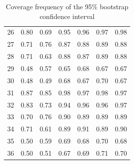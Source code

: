 \documentclass[authoryear, review, 11pt]{elsarticle}
\begin{document}
\begin{table}[ht]
\begin{center}
\begin{tabular}{rrrrrrr}
  26 & 0.80 & 0.69 & 0.95 & 0.96 & 0.97 & 0.98 \\ 
  27 & 0.71 & 0.76 & 0.87 & 0.88 & 0.89 & 0.88 \\ 
  28 & 0.71 & 0.63 & 0.88 & 0.87 & 0.89 & 0.88 \\ 
  29 & 0.48 & 0.57 & 0.65 & 0.68 & 0.67 & 0.67 \\ 
  30 & 0.48 & 0.49 & 0.68 & 0.67 & 0.70 & 0.67 \\ 
  31 & 0.87 & 0.85 & 0.98 & 0.97 & 0.98 & 0.97 \\ 
  32 & 0.83 & 0.73 & 0.94 & 0.96 & 0.96 & 0.97 \\ 
  33 & 0.70 & 0.76 & 0.90 & 0.89 & 0.89 & 0.89 \\ 
  34 & 0.71 & 0.61 & 0.89 & 0.91 & 0.89 & 0.90 \\ 
  35 & 0.50 & 0.59 & 0.69 & 0.68 & 0.70 & 0.68 \\ 
  36 & 0.50 & 0.51 & 0.67 & 0.69 & 0.71 & 0.70 \\ 
   \hline
\end{tabular}
\caption{Coverage frequency of the 95\% bootstrap confidence interval}
\end{center}
\end{table}
\end{document}
